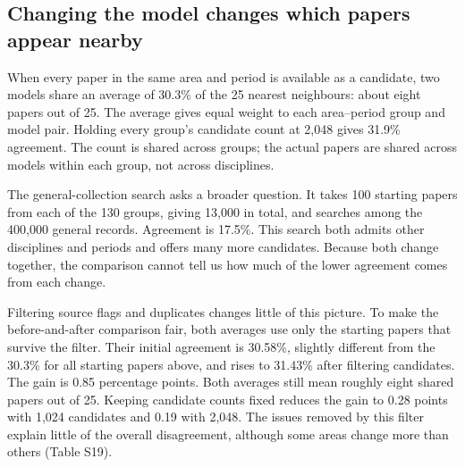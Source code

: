 \documentclass[12pt]{article}
\begin{document}
\FloatBarrier
\subsection{Changing the model changes which papers appear nearby}
When every paper in the same area and period is available as a candidate, two models share an average of 30.3\% of the 25 nearest neighbours: about eight papers out of 25. The average gives equal weight to each area--period group and model pair. Holding every group's candidate count at 2,048 gives 31.9\% agreement. The count is shared across groups; the actual papers are shared across models within each group, not across disciplines.

The general-collection search asks a broader question. It takes 100 starting papers from each of the 130 groups, giving 13,000 in total, and searches among the 400,000 general records. Agreement is 17.5\%. This search both admits other disciplines and periods and offers many more candidates. Because both change together, the comparison cannot tell us how much of the lower agreement comes from each change.

Filtering source flags and duplicates changes little of this picture. To make the before-and-after comparison fair, both averages use only the starting papers that survive the filter. Their initial agreement is 30.58\%, slightly different from the 30.3\% for all starting papers above, and rises to 31.43\% after filtering candidates. The gain is 0.85 percentage points. Both averages still mean roughly eight shared papers out of 25. Keeping candidate counts fixed reduces the gain to 0.28 points with 1,024 candidates and 0.19 with 2,048. The issues removed by this filter explain little of the overall disagreement, although some areas change more than others (Table S19).
\end{document}
